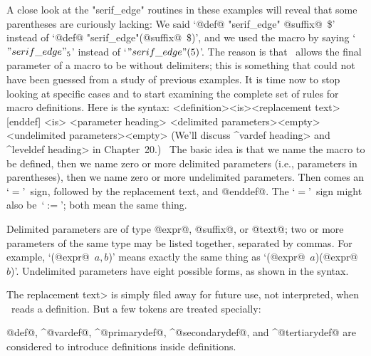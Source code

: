 {{{{\danger A close look at the "serif\_edge" routines in these examples
will reveal that some parentheses are curiously lacking: We said
`@def@ "serif\_edge" @suffix@~\$' instead of
`@def@ "serif\_edge"(@suffix@~\$)', and we used the macro by saying
`$"serif\_edge"_5$' instead of
`$"serif\_edge"(5)$'. The reason is that \MF\ allows the final parameter
of a macro to be without delimiters; this is something that could not
have been guessed from a study of previous examples. It is time now
to stop looking at specific cases and to start examining the complete
set of rules for macro definitions. Here is the syntax:
\beginsyntax
<definition><is><replacement text>[enddef]
<is>\is[=]
<parameter heading>
<delimited parameters>\is<empty>
 \is[expr]
 \alt[suffix]
<undelimited parameters>\is<empty>
\endsyntax
(We'll discuss ^\<vardef heading> and ^\<leveldef heading> in Chapter~20.)
\ The basic idea is that we name the macro to be defined, then we name
zero or more delimited parameters (i.e., parameters in parentheses),
then we name zero or more undelimited parameters. Then comes an `$=$'~sign,
followed by the replacement text, and @enddef@. The `$=$'~sign might also
be~`$:=$'\thinspace; both mean the same thing.

\danger Delimited parameters are of type @expr@, @suffix@, or @text@;
two or more parameters of the same type may be listed together, separated
by commas. For example, `(@expr@~$a,b$)' means exactly the same thing as
`(@expr@~$a$)(@expr@~$b$)'. Undelimited parameters have eight possible
forms, as shown in the syntax.

\ninepoint %

\danger The \<replacement text> is simply filed away for future use,
not interpreted, when \MF\ reads a definition. But a few tokens are
treated specially:\enddanger\nobreak

\medskip
\item\bull @def@, ^@vardef@, ^@primarydef@, ^@secondarydef@, and
^@tertiarydef@ are considered to introduce definitions inside definitions.

}}}}
